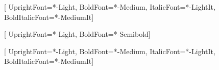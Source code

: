 
\newfontfamily{}[
  UprightFont=*-Light,
  BoldFont=*-Medium,
  ItalicFont=*-LightIt,
  BoldItalicFont=*-MediumIt]

\newfontfamily{}[
  UprightFont=*-Light,
  BoldFont=*-Semibold]

\newcommand{\serif}[0]{\SourceSerifPro}
 
\setmonofont{SourceCodePro}[
  UprightFont=*-Light,
  BoldFont=*-Medium,
  ItalicFont=*-LightIt,
  BoldItalicFont=*-MediumIt]
